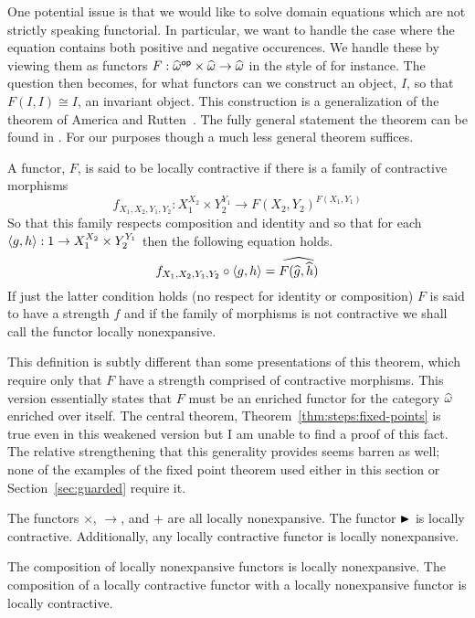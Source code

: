 One potential issue is that we would like to solve domain equations
which are not strictly speaking functorial. In particular, we want to
handle the case where the equation contains both positive and negative
occurences. We handle these by viewing them as functors
$F : \widehat{\omega}^{\mathsf{op}} \times \widehat{\omega} \to
\widehat{\omega}$
in the style of \citet{Pitts:96} for instance. The question then
becomes, for what functors can we construct an object, $I$, so that
$F(I, I) \cong I$, an invariant object. This construction is a
generalization of the theorem of America and
Rutten~\citep{America:87}. The fully general statement the theorem can
be found in \citet{Birkedal:domain:10,Birkedal:steps:11}. For our
purposes though a much less general theorem suffices.
\begin{defn}
  A functor, $F$, is said to be locally contractive if there is a
  family of contractive morphisms
  \[
    f_{X_1, X_2, Y_1, Y_2} :
    X_1^{X_2} \times Y_2^{Y_1} \to F(X_2, Y_2)^{F(X_1, Y_1)}
  \]
  So that this family respects composition and identity and
  so that for each $\left\langle g, h \right\rangle : 1 \to X_1^{X_2} \times Y_2^{Y_1}$
  then the following equation holds.
  \[
    f_{X_1, X_2, Y_1, Y_2} \circ \left\langle g, h \right\rangle =
    \widehat{F(\widehat{g}, \widehat{h})}
  \]
  If just the latter condition holds (no respect for identity or
  composition) $F$ is said to have a strength $f$ and if the family of
  morphisms is not contractive we shall call the functor locally
  nonexpansive.
\end{defn}
This definition is subtly different than some presentations of this
theorem, which require only that $F$ have a strength comprised of
contractive morphisms. This version essentially states that $F$ must
be an enriched functor for the category $\widehat{\omega}$ enriched
over itself. The central theorem, Theorem~\ref{thm:steps:fixed-points}
is true even in this weakened version but I am unable to find a proof
of this fact. The relative strengthening that this generality provides
seems barren as well; none of the examples of the fixed point theorem
used either in this section or Section~\ref{sec:guarded} require it.
\begin{example}
  The functors $\times$, $\to$, and $+$ are all locally
  nonexpansive. The functor ${\blacktriangleright}$ is locally
  contractive. Additionally, any locally contractive functor is locally
  nonexpansive.
\end{example}
\begin{lem}
  The composition of locally nonexpansive functors is locally
  nonexpansive. The composition of a locally contractive functor with
  a locally nonexpansive functor is locally contractive.
\end{lem}
